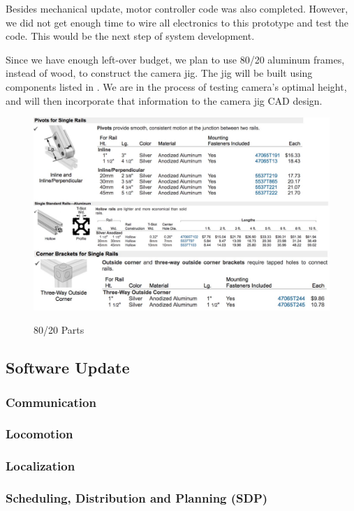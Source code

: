 Besides mechanical update, motor controller code was also completed. However, we did not get enough time to wire all electronics to this prototype and test the code. This would be the next step of system development. 

Since we have enough left-over budget, we plan to use 80/20 aluminum frames, instead of wood, to construct the camera jig. The jig will be built using components listed in . We are in the process of testing camera’s optimal height, and will then incorporate that information to the camera jig CAD design. 

\begin{figure}[h!]
\centering
\includegraphics[width=0.98\columnwidth]{CAD/8020.jpeg}
\label{fig:em4}
\caption{80/20 Parts}
\end{figure}

\subsection{Software Update}
\label{sec:software_progress}

\subsubsection{Communication}
\subsubsection{Locomotion}
\subsubsection{Localization}
\subsubsection{Scheduling, Distribution and Planning (SDP)}

